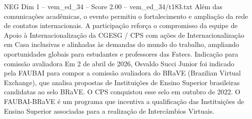 \begin{textsample}{NEG Dim 1 – vem\_ed\_34 – Score 2.00 – vem\_ed\_34/t183.txt}
Além das comunicações acadêmicas, o evento permitiu o fortalecimento e ampliação da rede de contatos internacionais.
A participação reforça o compromisso da equipe de Apoio à Internacionalização da CGESG / CPS com ações de Internacionalização em Casa inclusivas e alinhadas às demandas do mundo do trabalho, ampliando oportunidades globais para estudantes e professores das Fatecs.
Indicação para comissão avaliadora Em 2 de abril de 2026, Osvaldo Succi Junior foi indicado pela FAUBAI para compor a comissão avaliadora do BRaVE (Brazilian Virtual Exchange), que analisa propostas de Instituições de Ensino Superior brasileiras candidatas ao selo BRaVE.
O CPS conquistou esse selo em outubro de 2022.
O FAUBAI-BRaVE é um programa que incentiva a qualificação das Instituições de Ensino Superior associadas para a realização de Intercâmbios Virtuais.

\end{textsample}
